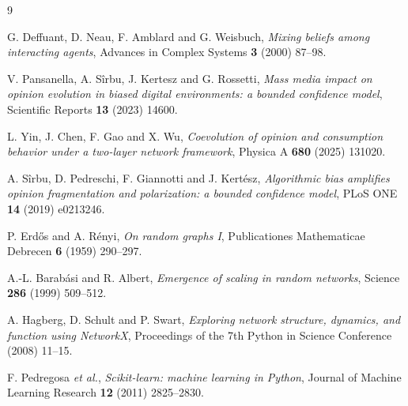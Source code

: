 \documentclass[11pt]{article}
\begin{document}
\begin{thebibliography}{9}
\setlength{\itemsep}{3pt}

G. Deffuant, D. Neau, F. Amblard and G. Weisbuch, \emph{Mixing beliefs among interacting agents}, Advances in Complex Systems \textbf{3} (2000) 87--98.

V. Pansanella, A. Sîrbu, J. Kertesz and G. Rossetti, \emph{Mass media impact on opinion evolution in biased digital environments: a bounded confidence model}, Scientific Reports \textbf{13} (2023) 14600.

L. Yin, J. Chen, F. Gao and X. Wu, \emph{Coevolution of opinion and consumption behavior under a two-layer network framework}, Physica A \textbf{680} (2025) 131020.

A. Sîrbu, D. Pedreschi, F. Giannotti and J. Kertész, \emph{Algorithmic bias amplifies opinion fragmentation and polarization: a bounded confidence model}, PLoS ONE \textbf{14} (2019) e0213246.

P. Erd\H{o}s and A. Rényi, \emph{On random graphs I}, Publicationes Mathematicae Debrecen \textbf{6} (1959) 290--297.

A.-L. Barabási and R. Albert, \emph{Emergence of scaling in random networks}, Science \textbf{286} (1999) 509--512.

A. Hagberg, D. Schult and P. Swart, \emph{Exploring network structure, dynamics, and function using NetworkX}, Proceedings of the 7th Python in Science Conference (2008) 11--15.

F. Pedregosa \emph{et al.}, \emph{Scikit-learn: machine learning in Python}, Journal of Machine Learning Research \textbf{12} (2011) 2825--2830.

\end{thebibliography}
\end{document}
